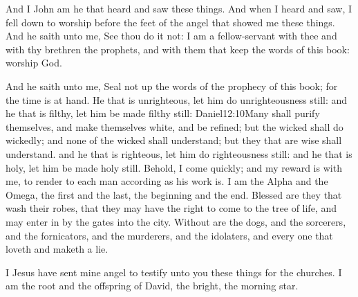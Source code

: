 And I John am he that heard and saw these things. And when I heard and saw, I fell down to worship before the feet of the angel that showed me these things. 
And he saith unto me, See thou do it not: I am a fellow-servant with thee and with thy brethren the prophets, and with them that keep the words of this book: worship God.

And he saith unto me, Seal not up the words of the prophecy of this book; for the time is at hand. 
He that is unrighteous, let him do unrighteousness still: and he that is filthy, let him be made filthy still:%
					{Daniel}{12:10}{Many shall purify themselves, and make themselves white, and be refined; but the wicked shall do wickedly; and none of the wicked shall understand; but they that are wise shall understand.} %
and he that is righteous, let him do righteousness still: and he that is holy, let him be made holy still.%
Behold, I come quickly; and my reward is with me, to render to each man according as his work is. 
I am the Alpha and the Omega, the first and the last, the beginning and the end. 
Blessed are they that wash their robes, that they may have the right to come to the tree of life, and may enter in by the gates into the city.%
 Without are the dogs, and the sorcerers, and the fornicators, and the murderers, and the idolaters, and every one that loveth and maketh a lie.

I Jesus have sent mine angel%
to testify unto you these things for the churches. I am the root and the offspring of David, the bright, the morning star.%

